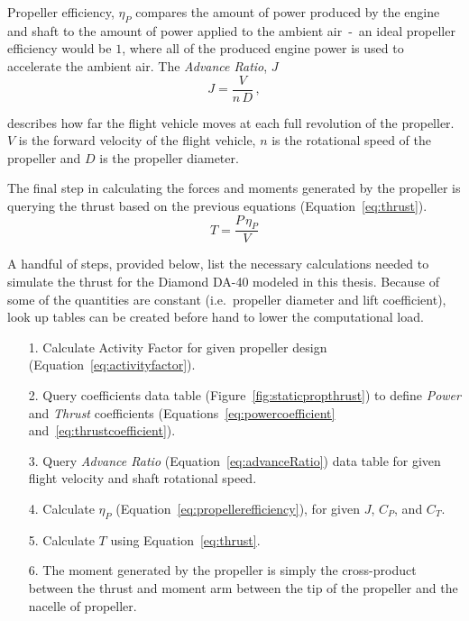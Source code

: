 Propeller efficiency, \( \eta_P \) compares the amount of power produced by the engine and shaft to the amount of power applied to the ambient air~-~an ideal propeller efficiency would be \(1\), where all of the produced engine power is used to accelerate the ambient air. The \textit{Advance Ratio}, \(J\)
\begin{equation}\label{eq:advanceRatio}
    J = \frac{V}{n \, D} \, ,
\end{equation}

describes how far the flight vehicle moves at each full revolution of the propeller.
\(V\) is the forward velocity of the flight vehicle, \(n\) is the rotational speed of the propeller and \(D\) is the propeller diameter.

The final step in calculating the forces and moments generated by the propeller is querying the thrust based on the previous equations (Equation~\ref{eq:thrust}).
\begin{equation}\label{eq:thrust}
    T = \frac{P \, \eta_P}{V}
\end{equation}

A handful of steps, provided below, list the necessary calculations needed to simulate the thrust for the Diamond DA-40 modeled in this thesis. Because of some of the quantities are constant (i.e.\ propeller diameter and lift coefficient), look up tables can be created before hand to lower the computational load.

\begin{itemize}
    \item[1.] Calculate Activity Factor for given propeller design (Equation~\ref{eq:activityfactor}).
    \item[2.] Query coefficients data table (Figure~\ref{fig:staticpropthrust}) to define \textit{Power} and \textit{Thrust} coefficients (Equations~\ref{eq:powercoefficient} and~\ref{eq:thrustcoefficient}).
    \item[3.] Query \textit{Advance Ratio} (Equation~\ref{eq:advanceRatio}) data table for given flight velocity and shaft rotational speed.
    \item[4.] Calculate \( \eta_P \) (Equation~\ref{eq:propellerefficiency}), for given \(J\), \(C_P\), and \(C_T\).
    \item[5.] Calculate \(T\) using Equation~\ref{eq:thrust}.
    \item[6.] The moment generated by the propeller is simply the cross-product between the thrust and moment arm between the tip of the propeller and the nacelle of propeller.
\end{itemize}

